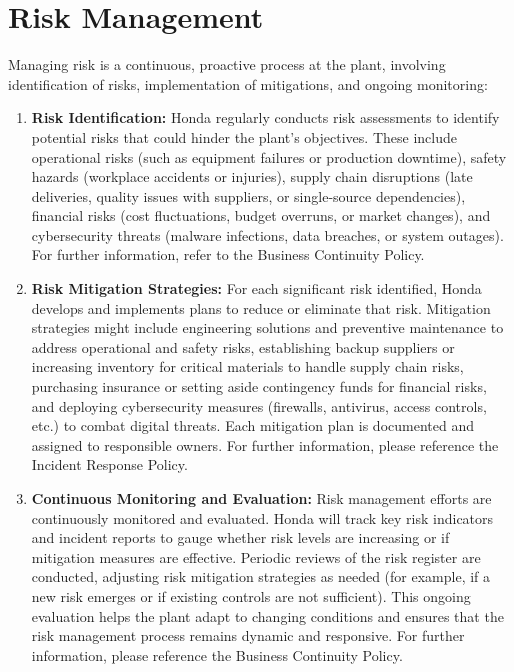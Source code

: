 \section{Risk Management}
Managing risk is a continuous, proactive process at the plant, involving identification of risks, implementation of mitigations, and ongoing monitoring:
\begin{enumerate}
    \item \textbf{Risk Identification:} Honda regularly conducts risk assessments to identify potential risks that could hinder the plant's objectives. These include operational risks (such as equipment failures or production downtime), safety hazards (workplace accidents or injuries), supply chain disruptions (late deliveries, quality issues with suppliers, or single-source dependencies), financial risks (cost fluctuations, budget overruns, or market changes), and cybersecurity threats (malware infections, data breaches, or system outages). For further information, refer to the Business Continuity Policy.
    \item \textbf{Risk Mitigation Strategies:} For each significant risk identified, Honda develops and implements plans to reduce or eliminate that risk. Mitigation strategies might include engineering solutions and preventive maintenance to address operational and safety risks, establishing backup suppliers or increasing inventory for critical materials to handle supply chain risks, purchasing insurance or setting aside contingency funds for financial risks, and deploying cybersecurity measures (firewalls, antivirus, access controls, etc.) to combat digital threats. Each mitigation plan is documented and assigned to responsible owners. For further information, please reference the Incident Response Policy.
    \item \textbf{Continuous Monitoring and Evaluation:} Risk management efforts are continuously monitored and evaluated. Honda will track key risk indicators and incident reports to gauge whether risk levels are increasing or if mitigation measures are effective. Periodic reviews of the risk register are conducted, adjusting risk mitigation strategies as needed (for example, if a new risk emerges or if existing controls are not sufficient). This ongoing evaluation helps the plant adapt to changing conditions and ensures that the risk management process remains dynamic and responsive. For further information, please reference the Business Continuity Policy.
\end{enumerate}

